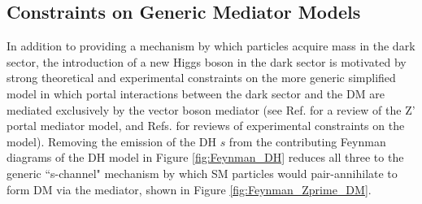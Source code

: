 \subsection{Constraints on Generic \Zprime Mediator Models} 
\label{sec:Zprime_model_constraints}

In addition to providing a mechanism by which particles acquire mass in the dark sector, the introduction of a new Higgs boson in the dark sector is motivated by strong theoretical and experimental constraints on the more generic simplified model in which portal interactions between the dark sector and the DM are mediated exclusively by the \Zprime vector boson mediator (see Ref. \cite{Zprime_portal_gen} for a review of the Z' portal mediator model, and Refs. \cite{Zprime_portal_dijet, Zprime_portal_monojet_dijet} for reviews of experimental constraints on the model). Removing the emission of the DH \(s\) from the contributing Feynman diagrams of the DH model in Figure \ref{fig:Feynman_DH} reduces all three to the generic ``s-channel" mechanism by which SM particles would pair-annihilate to form DM via the \Zprime mediator, shown in Figure \ref{fig:Feynman_Zprime_DM}. 


